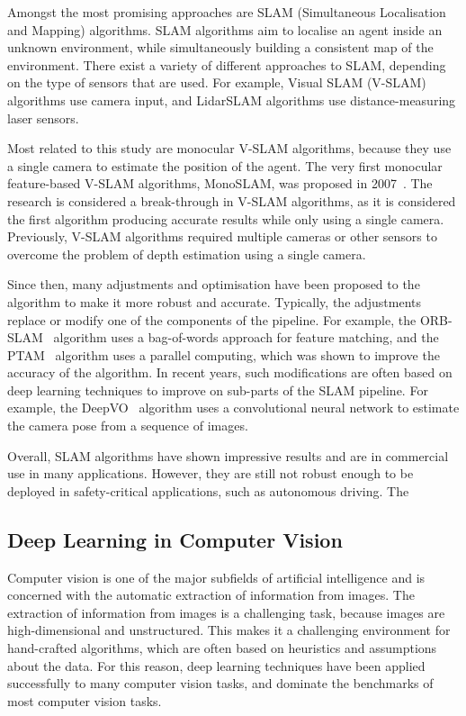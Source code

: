 \documentclass[a4paper]{article}
\begin{document}
  Amongst the most promising approaches are SLAM (Simultaneous Localisation and
  Mapping) algorithms. SLAM algorithms aim to localise an agent inside an
  unknown environment, while simultaneously building a consistent map of the
  environment. There exist a variety of different approaches to SLAM, depending
  on the type of sensors that are used. For example, Visual SLAM (V-SLAM)
  algorithms use camera input, and LidarSLAM algorithms use distance-measuring
  laser sensors. 

  Most related to this study are monocular V-SLAM algorithms, because they use a
  single camera to estimate the position of the agent. The very first monocular
  feature-based V-SLAM algorithms, MonoSLAM, was proposed in
  2007~\cite{mono-slam}. The research is considered a break-through in V-SLAM
  algorithms, as it is considered the first algorithm producing accurate results
  while only using a single camera. Previously, V-SLAM algorithms required
  multiple cameras or other sensors to overcome the problem of depth estimation
  using a single camera.

  Since then, many adjustments and optimisation have been proposed to the
  algorithm to make it more robust and accurate. Typically, the adjustments
  replace or modify one of the components of the pipeline. For example, the
  ORB-SLAM~\cite{orb-slam} algorithm uses a bag-of-words approach for feature
  matching, and the PTAM~\cite{ptam} algorithm uses a parallel computing, which
  was shown to improve the accuracy of the algorithm. In recent years, such
  modifications are often based on deep learning techniques to improve on
  sub-parts of the SLAM pipeline. For example, the DeepVO~\cite{deep-vo}
  algorithm uses a convolutional neural network to estimate the camera pose from
  a sequence of images. 

  Overall, SLAM algorithms have shown impressive results and are in commercial
  use in many applications. However, they are still not robust enough to be
  deployed in safety-critical applications, such as autonomous driving. The

  \subsection{Deep Learning in Computer Vision} %

  Computer vision is one of the major subfields of artificial intelligence and
  is concerned with the automatic extraction of information from images. The
  extraction of information from images is a challenging task, because images
  are high-dimensional and unstructured. This makes it a challenging environment
  for hand-crafted algorithms, which are often based on heuristics and
  assumptions about the data. For this reason, deep learning techniques have
  been applied successfully to many computer vision tasks, and dominate the
  benchmarks of most computer vision tasks.
\end{document}
